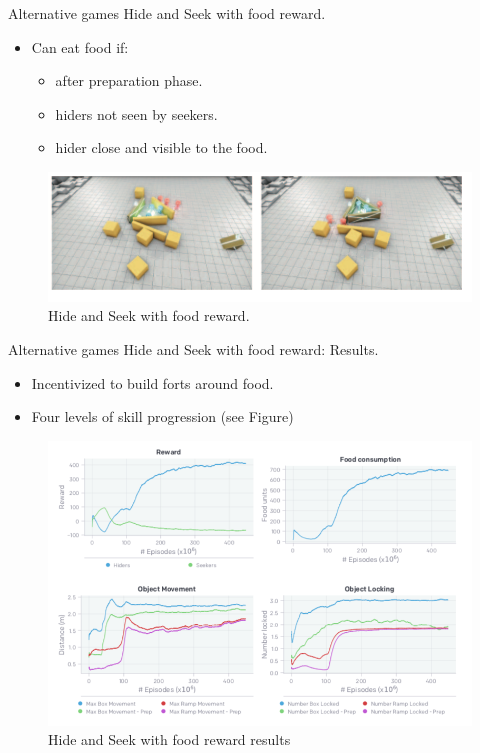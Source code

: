 \documentclass{beamer}
\begin{document}
\begin{frame}{Alternative games}
Hide and Seek with food reward.
    \begin{itemize}
        \item Can eat food if:
        \begin{itemize}
            \item after preparation phase.
            \item hiders not seen by seekers.
            \item hider close and visible to the food.
        \end{itemize}{}
    \end{itemize}{}
    \begin{figure}
        \centering
        \includegraphics[scale=0.4]{FigureA6.png}
        \caption{Hide and Seek with food reward.}
    \end{figure}{}
\end{frame}{}
\begin{frame}{Alternative games}
Hide and Seek with food reward: Results.
    \begin{itemize}
        \item Incentivized to build forts around food.
        \item Four levels of skill progression (see Figure)
    \end{itemize}{}
    \begin{figure}
        \centering
        \includegraphics[scale=0.25]{FigureA7.png}
        \caption{Hide and Seek with food reward results}
    \end{figure}{}
\end{frame}{}
\end{document}
